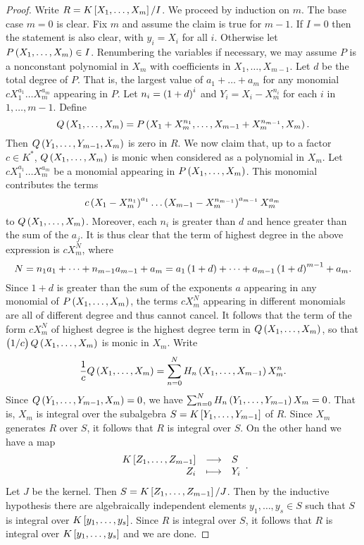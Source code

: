 \begin{proof}
Write $ R = K\sbr{X_1, \dots, X_m} / I $. We proceed by induction on $ m $. The base case $ m = 0 $ is clear. Fix $ m $ and assume the claim is true for $ m - 1 $. If $ I = 0 $ then the statement is also clear, with $ y_i = X_i $ for all $ i $. Otherwise let $ P\br{X_1, \dots, X_m} \in I $. Renumbering the variables if necessary, we may assume $ P $ is a nonconstant polynomial in $ X_m $ with coefficients in $ X_1, \dots, X_{m - 1} $. Let $ d $ be the total degree of $ P $. That is, the largest value of $ a_1 + \dots + a_m $ for any monomial $ cX_1^{a_1} \dots X_m^{a_m} $ appearing in $ P $. Let $ n_i = \br{1 + d}^i $ and $ Y_i = X_i - X_m^{n_i} $ for each $ i $ in $ 1, \dots, m - 1 $. Define
$$ Q\br{X_1, \dots, X_m} = P\br{X_1 + X_m^{n_1}, \dots, X_{m - 1} + X_m^{n_{m - 1}}, X_m}. $$
Then $ Q\br{Y_1, \dots, Y_{m - 1}, X_m} $ is zero in $ R $. We now claim that, up to a factor $ c \in K^* $, $ Q\br{X_1, \dots, X_m} $ is monic when considered as a polynomial in $ X_m $. Let $ cX_1^{a_1} \dots X_m^{a_m} $ be a monomial appearing in $ P\br{X_1, \dots, X_m} $. This monomial contributes the terms
$$ c\br{X_1 - X_m^{n_1}}^{a_1} \dots \br{X_{m - 1} - X_m^{n_{m - 1}}}^{a_{m - 1}}X_m^{a_m} $$
to $ Q\br{X_1, \dots, X_m} $. Moreover, each $ n_i $ is greater than $ d $ and hence greater than the sum of the $ a_j $. It is thus clear that the term of highest degree in the above expression is $ cX_m^N $, where
$$ N = n_1a_1 + \dots + n_{m - 1}a_{m - 1} + a_m = a_1\br{1 + d} + \dots + a_{m - 1}\br{1 + d}^{m - 1} + a_m. $$
Since $ 1 + d $ is greater than the sum of the exponents $ a $ appearing in any monomial of $ P\br{X_1, \dots, X_m} $, the terms $ cX_m^N $ appearing in different monomials are all of different degree and thus cannot cancel. It follows that the term of the form $ cX_m^N $ of highest degree is the highest degree term in $ Q\br{X_1, \dots, X_m} $, so that $ \br{1 / c}Q\br{X_1, \dots, X_m} $ is monic in $ X_m $. Write
$$ \dfrac{1}{c}Q\br{X_1, \dots, X_m} = \sum_{n = 0}^N H_n\br{X_1, \dots, X_{m - 1}}X_m^n. $$
Since $ Q\br{Y_1, \dots, Y_{m - 1}, X_m} = 0 $, we have $ \sum_{n = 0}^N H_n\br{Y_1, \dots, Y_{m - 1}}X_m = 0 $. That is, $ X_m $ is integral over the subalgebra $ S = K\sbr{Y_1, \dots, Y_{m - 1}} $ of $ R $. Since $ X_m $ generates $ R $ over $ S $, it follows that $ R $ is integral over $ S $. On the other hand we have a map
$$ \function{K\sbr{Z_1, \dots, Z_{m - 1}}}{S}{Z_i}{Y_i}. $$
Let $ J $ be the kernel. Then $ S = K\sbr{Z_1, \dots, Z_{m - 1}} / J $. Then by the inductive hypothesis there are algebraically independent elements $ y_1, \dots, y_s \in S $ such that $ S $ is integral over $ K\sbr{y_1, \dots, y_s} $. Since $ R $ is integral over $ S $, it follows that $ R $ is integral over $ K\sbr{y_1, \dots, y_s} $ and we are done.
\end{proof}

